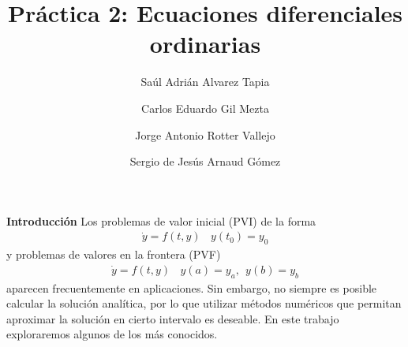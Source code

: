 \documentclass[11pt]{article}
\begin{document}
\author{Saúl Adrián Alvarez Tapia \and Carlos Eduardo Gil Mezta \and Jorge Antonio Rotter Vallejo \and Sergio de Jesús Arnaud Gómez}

\title{\Huge Práctica 2: Ecuaciones diferenciales ordinarias}
\date{}
\maketitle

\noindent
\textbf{\LARGE{Introducción}} 
\newline
Los problemas de valor inicial (PVI) de la forma
\begin{align*}
\dot{y} = f(t,y) \ \ \ \ y(t_0) = y_0
\end{align*}
y problemas de valores en la frontera (PVF)
\begin{align*}
\dot{y} = f(t,y) \ \ \ \ y(a) = y_a, \ \ y(b) = y_b
\end{align*}
aparecen frecuentemente en aplicaciones. Sin embargo, no siempre es posible calcular
la solución analítica, por lo que utilizar métodos numéricos que permitan aproximar
la solución en cierto intervalo es deseable. En este trabajo exploraremos algunos de
los más conocidos.
\newline
\end{document}
